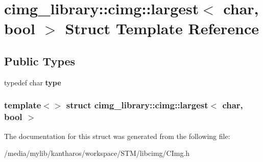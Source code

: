 \hypertarget{structcimg__library_1_1cimg_1_1largest_3_01char_00_01bool_01_4}{
\section{cimg\_\-library::cimg::largest$<$ char, bool $>$ Struct Template Reference}
\label{structcimg__library_1_1cimg_1_1largest_3_01char_00_01bool_01_4}
}
\subsection*{Public Types}
\begin{DoxyCompactItemize}
\item 
\hypertarget{structcimg__library_1_1cimg_1_1largest_3_01char_00_01bool_01_4_a2ebb7b40d6b67cb80ba622e49a5b22ec}{
typedef char {\bfseries type}}
\label{structcimg__library_1_1cimg_1_1largest_3_01char_00_01bool_01_4_a2ebb7b40d6b67cb80ba622e49a5b22ec}

\end{DoxyCompactItemize}
\subsubsection*{template$<$$>$ struct cimg\_\-library::cimg::largest$<$ char, bool $>$}



The documentation for this struct was generated from the following file:\begin{DoxyCompactItemize}
\item 
/media/mylib/kantharos/workspace/STM/libcimg/CImg.h\end{DoxyCompactItemize}
